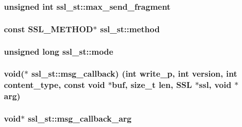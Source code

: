\subsubsection[{\texorpdfstring{max\+\_\+send\+\_\+fragment}{max_send_fragment}}]{\setlength{\rightskip}{0pt plus 5cm}unsigned int ssl\+\_\+st\+::max\+\_\+send\+\_\+fragment}\hypertarget{structssl__st_a201ff2c24c4a950fc529451563dac099}{}\label{structssl__st_a201ff2c24c4a950fc529451563dac099}
\subsubsection[{\texorpdfstring{method}{method}}]{\setlength{\rightskip}{0pt plus 5cm}const {\bf S\+S\+L\+\_\+\+M\+E\+T\+H\+OD}$\ast$ ssl\+\_\+st\+::method}\hypertarget{structssl__st_a10dff58d99726fe56b47ec037c54802e}{}\label{structssl__st_a10dff58d99726fe56b47ec037c54802e}
\subsubsection[{\texorpdfstring{mode}{mode}}]{\setlength{\rightskip}{0pt plus 5cm}unsigned long ssl\+\_\+st\+::mode}\hypertarget{structssl__st_a10add2996a9ac029c3a8a4c19587e1b0}{}\label{structssl__st_a10add2996a9ac029c3a8a4c19587e1b0}
\subsubsection[{\texorpdfstring{msg\+\_\+callback}{msg_callback}}]{\setlength{\rightskip}{0pt plus 5cm}void($\ast$ ssl\+\_\+st\+::msg\+\_\+callback) (int write\+\_\+p, int {\bf version}, int content\+\_\+type, const void $\ast$buf, size\+\_\+t {\bf len}, {\bf S\+SL} $\ast$ssl, void $\ast$arg)}\hypertarget{structssl__st_a0b5f95998bc3a4a4193adeca3b7b289a}{}\label{structssl__st_a0b5f95998bc3a4a4193adeca3b7b289a}
\subsubsection[{\texorpdfstring{msg\+\_\+callback\+\_\+arg}{msg_callback_arg}}]{\setlength{\rightskip}{0pt plus 5cm}void$\ast$ ssl\+\_\+st\+::msg\+\_\+callback\+\_\+arg}\hypertarget{structssl__st_a265c0d1adbd1e76b1b326a1f82b0cfcf}{}\label{structssl__st_a265c0d1adbd1e76b1b326a1f82b0cfcf}
